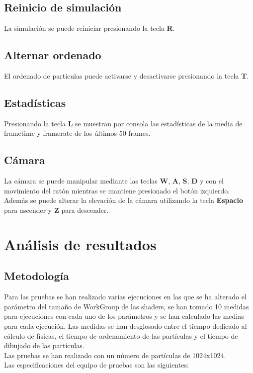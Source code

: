 \documentclass[10pt,oneside,a4paper]{article}
\begin{document}
\subsection{Reinicio de simulación}
La simulación se puede reiniciar presionando la tecla \textbf{R}.

\subsection{Alternar ordenado}
El ordenado de partículas puede activarse y desactivarse presionando la tecla \textbf{T}.

\subsection{Estadísticas}
Presionando la tecla \textbf{L} se muestran por consola las estadísticas de la media de frametime y framerate de los últimos 50 frames.

\subsection{Cámara}
La cámara se puede manipular mediante las teclas \textbf{W}, \textbf{A}, \textbf{S}, \textbf{D} y con el movimiento del ratón mientras se mantiene presionado el botón izquierdo. Además se puede alterar la elevación de la cámara utilizando la tecla \textbf{Espacio} para ascender y \textbf{Z} para descender.

\section{Análisis de resultados}
\subsection{Metodología}
Para las pruebas se han realizado varias ejecuciones en las que se ha alterado el parámetro del tamaño de WorkGroup de las shaders, se han tomado 10 medidas para ejecuciones con cada uno de los parámetros y se han calculado las medias para cada ejecución. Las medidas se han desglosado entre el tiempo dedicado al cálculo de físicas, el tiempo de ordenamiento de las partículas y el tiempo de dibujado de las partículas.\\

Las pruebas se han realizado con un número de partículas de 1024x1024.\\

Las especificaciones del equipo de pruebas son las siguientes:
\end{document}
